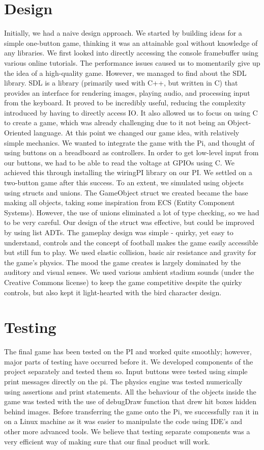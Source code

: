 \documentclass[11pt]{article}
\begin{document}
\section{Design}
Initially, we had a naive design approach. We started by building ideas for a simple one-button game, thinking it was an attainable goal without knowledge of any libraries. We first looked into directly accessing the console framebuffer using various online tutorials. The performance issues caused us to momentarily give up the idea of a high-quality game.
However, we managed to find about the SDL library. SDL is a library (primarily used with C++, but written in C) that provides an interface for rendering images, playing audio, and processing input from the keyboard. It proved to be incredibly useful, reducing the complexity introduced by having to directly access IO. It also allowed us to focus on using C to create a game, which was already challenging due to it not being an Object-Oriented language. At this point we changed our game idea, with relatively simple mechanics.
We wanted to integrate the game with the Pi, and thought of using buttons on a breadboard as controllers. In order to get low-level input from our buttons, we had to be able to read the voltage at GPIOs using C. We achieved this through installing the wiringPI library on our PI. We settled on a two-button game after this success.
To an extent, we simulated using objects using structs and unions. The GameObject struct we created became the base making all objects, taking some inspiration from ECS (Entity Component Systems). However, the use of unions eliminated a lot of type checking, so we had to be very careful. Our design of the struct was effective, but could be improved by using list ADTs.
The gameplay design was simple - quirky, yet easy to understand, controls and the concept of football makes the game easily accessible but still fun to play. We used elastic collision, basic air resistance and gravity for the game's physics.
The mood the game creates is largely dominated by the auditory and visual senses. We used various ambient stadium sounds (under the Creative Commons license) to keep the game competitive despite the quirky controls, but also kept it light-hearted with the bird character design.

\section{Testing}
The final game has been tested on the PI and worked quite smoothly; however, major parts of testing have occurred before it. We developed components of the project separately and tested them so. Input buttons were tested using simple print messages directly on the pi. The physics engine was tested numerically using assertions and print statements. All the behaviour of the objects inside the game was tested with the use of debugDraw function that drew hit boxes hidden behind images. Before transferring the game onto the Pi, we successfully ran it in on a Linux machine as it was easier to manipulate the code using IDE's and other more advanced tools. We believe that testing separate components was a very efficient way of making sure that our final product will work. 
\end{document}
